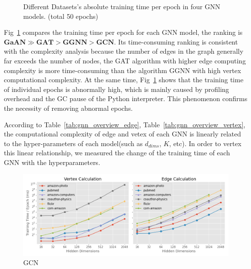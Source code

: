 \begin{figure}
    \caption{Different Datasets's absolute training time per epoch in four GNN models. (total 50 epochs)}
	\label{fig:exp_absolute_training_time}
\end{figure}

Fig~\ref{fig:exp_absolute_training_time} compares the training time per epoch for each GNN model, the ranking is $\boldsymbol{GaAN} \gg \boldsymbol{GAT} > \boldsymbol{GGNN} > \boldsymbol{GCN}$.
Its time-consuming ranking is consistent with the complexity analysis because the number of edges in the graph generally far exceeds the number of nodes, 
the GAT algorithm with higher edge computing complexity is more time-consuming than the algorithm GGNN with high vertex computational complexity. At the same time, 
Fig~\ref{fig:exp_absolute_training_time} shows that the training time of individual epochs is abnormally high, which is mainly caused by profiling overhead and the GC pause of the Python interpreter.
This phenomenon confirms the necessity of removing abnormal epochs.

According to Table~\ref{tab:gnn_overview_edge}, Table~\ref{tab:gnn_overview_vertex}, the computational complexity of edge and vetex of each GNN is linearly related to the 
hyper-parameters of each model(such as $d_{dims}$, $K$, etc). In order to vertex this linear relationship, we measured the change of the training time of each GNN with the hyperparameters.

\begin{figure}
    \centering
    \includegraphics[width=0.7\columnwidth]{figs/experiments/exp_hyperparameter_on_vertex_edge_phase_time_gcn.png}
    \caption{GCN}
    \label{fig:exp_hyperparameter_on_vertex_edge_phase_time_gcn}
\end{figure}

